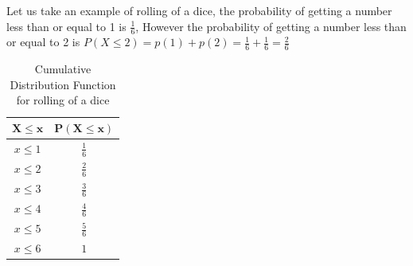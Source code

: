 \documentclass[twoside,12pt]{report}  %
\begin{document}
\begin{tcolorbox}[colback=blue!5!white, colframe=blue!75!black, title = \textbf{Cumulative Distribution Function for Discreet Random Variable }] 
	Let us take an example of rolling of a dice, the probability of getting a number less than or equal to 1 is $\frac{1}{6}$, However the probability of getting a number less than or equal to 2 is $P(X \le 2) = p(1) + p(2) = \frac{1}{6} + \frac{1}{6} = \frac{2}{6}$
		\begin{table}[H]
		\centering
		\begin{tabular}{c|c}
			$\boldsymbol{X \le x}$ & $\boldsymbol{P(X \le x)}$      \\
			\hline
			$x \le 1$     & $\frac{1}{6}$ \\
			$x \le 2$     & $\frac{2}{6}$ \\
			$x \le 3$     & $\frac{3}{6}$ \\
			$x \le 4$     & $\frac{4}{6}$ \\
			$x \le 5$     & $\frac{5}{6}$ \\
			$x \le 6$     & $ 1 $
		\end{tabular}
		\caption{Cumulative Distribution Function for rolling of a dice}
	\end{table}


\end{tcolorbox}
\end{document}
